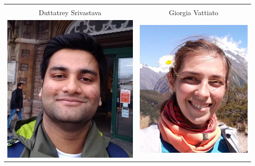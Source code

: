 \documentclass{beamer}
\begin{document}
{\begin{tabular}{ c c }
		 & \\
		Duttatrey Srivastava & Giorgia Vattiato        \\  
		\includegraphics[scale=0.12]{Figures/Dutta.jpg} & \includegraphics[scale=0.13]{Figures/Giorgia.jpg}    
	\end{tabular}}
\end{document}

